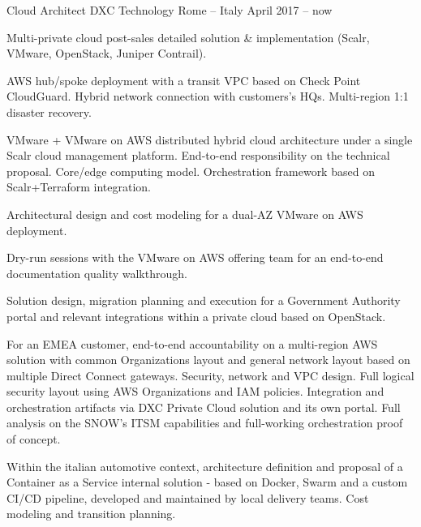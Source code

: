 
\begin{cventries}

  \cventry
    {Cloud Architect} %
    {DXC Technology} %
    {Rome -- Italy} %
    {April 2017 -- now} %
    {
      \begin{cvitems} %
        \item {Multi-private cloud post-sales detailed solution \& implementation (Scalr, VMware, OpenStack, Juniper Contrail).}
        \item {AWS hub/spoke deployment with a transit VPC based on Check Point CloudGuard. Hybrid network connection with customers's HQs. Multi-region 1:1 disaster recovery.}
        \item {VMware + VMware on AWS distributed hybrid cloud architecture under a single Scalr cloud management platform. End-to-end responsibility on the technical proposal. Core/edge computing model. Orchestration framework based on Scalr+Terraform integration.}
        \item {Architectural design and cost modeling for a dual-AZ VMware on AWS deployment.}
        \item {Dry-run sessions with the VMware on AWS offering team for an end-to-end documentation quality walkthrough.}
        \item {Solution design, migration planning and execution for a Government Authority portal and relevant integrations within a private cloud based on OpenStack.}
        \item {For an EMEA customer, end-to-end accountability on a multi-region AWS solution with common Organizations layout and general network layout based on multiple Direct Connect gateways. Security, network and VPC design. Full logical security layout using AWS Organizations and IAM policies. Integration and orchestration artifacts via DXC Private Cloud solution and its own portal. Full analysis on the SNOW's ITSM capabilities and full-working orchestration proof of concept.}
        \item {Within the italian automotive context, architecture definition and proposal of a Container as a Service internal solution - based on Docker, Swarm and a custom CI/CD pipeline, developed and maintained by local delivery teams. Cost modeling and transition planning.}
      \end{cvitems}
    }


\end{cventries}
